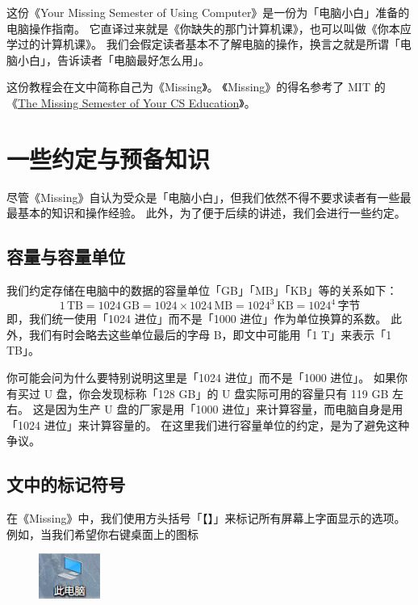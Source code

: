 \documentclass[a4paper,x11names]{book}
\begin{document}
这份《Your Missing Semester of Using Computer》是一份为「电脑小白」准备的电脑操作指南。
它直译过来就是《你缺失的那门计算机课》，也可以叫做《你本应学过的计算机课》。
我们会假定读者基本不了解电脑的操作，换言之就是所谓「电脑小白」，告诉读者「电脑最好怎么用」。

这份教程会在文中简称自己为《Missing》。
《Missing》的得名参考了 MIT 的《\href{https://missing.csail.mit.edu/}{The Missing Semester of Your CS Education}》。

\mainmatter

\setcounter{chapter}{-1}

\chapter{一些约定与预备知识}

尽管《Missing》自认为受众是「电脑小白」，但我们依然不得不要求读者有一些最最基本的知识和操作经验。
此外，为了便于后续的讲述，我们会进行一些约定。

\section{容量与容量单位}

我们约定存储在电脑中的数据的容量单位「GB」「MB」「KB」等的关系如下：
\[1\,\mathrm{TB}=1024\,\mathrm{GB}=1024\times1024\,\mathrm{MB}=1024^3\,\mathrm{KB}=1024^4\,\text{字节}\]
即，我们统一使用「1024 进位」而不是「1000 进位」作为单位换算的系数。
此外，我们有时会略去这些单位最后的字母 B，即文中可能用「1 T」来表示「1 TB」。

你可能会问为什么要特别说明这里是「1024 进位」而不是「1000 进位」。
如果你有买过 U 盘，你会发现标称「128 GB」的 U 盘实际可用的容量只有 119 GB 左右。
这是因为生产 U 盘的厂家是用「1000 进位」来计算容量，而电脑自身是用「1024 进位」来计算容量的。
在这里我们进行容量单位的约定，是为了避免这种争议。

\section{文中的标记符号}

在《Missing》中，我们使用方头括号「【】」来标记所有屏幕上字面显示的选项。
例如，当我们希望你右键桌面上的图标
\begin{figure}[htb!]
  \centering
  \includegraphics[width=2cm]{src/This_PC.png}
\end{figure}
\end{document}

